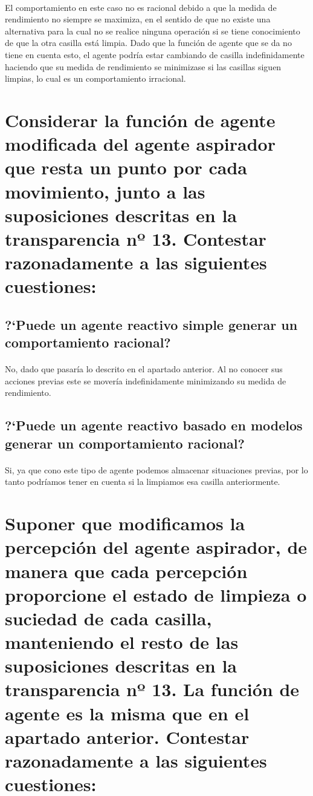 \documentclass[10pt, a4paper,spanish]{article}
\begin{document}
		\paragraph{}
		El comportamiento en este caso no es racional debido a que la medida de rendimiento no siempre se maximiza, en el sentido de que no existe una alternativa para la cual no se realice ninguna operación si se tiene conocimiento de que la otra casilla está limpia. Dado que la función de agente que se da no tiene en cuenta esto, el agente podría estar cambiando de casilla indefinidamente haciendo que su medida de rendimiento se minimizase si las casillas siguen limpias, lo cual es un comportamiento irracional.



	\section{Considerar la función de agente modificada del agente aspirador que resta un punto por cada movimiento, junto a las suposiciones descritas en la transparencia nº 13. Contestar razonadamente a las siguientes cuestiones:}


		\subsection{?`Puede un agente reactivo simple generar un comportamiento racional?}

			\paragraph{}
			No, dado que pasaría lo descrito en el apartado anterior. Al no conocer sus acciones previas este se movería indefinidamente minimizando su medida de rendimiento.


		\subsection{?`Puede un agente reactivo basado en modelos generar un comportamiento racional?}

			\paragraph{}
			Si, ya que cono este tipo de agente podemos almacenar situaciones previas, por lo tanto podríamos tener en cuenta si la limpiamos esa casilla anteriormente.



	\section{Suponer que modificamos la percepción del agente aspirador, de manera que cada percepción proporcione el estado de limpieza o suciedad de cada casilla, manteniendo el resto de las suposiciones descritas en la transparencia nº 13. La función de agente es la misma que en el apartado anterior. Contestar razonadamente a las siguientes cuestiones:}
\end{document}
